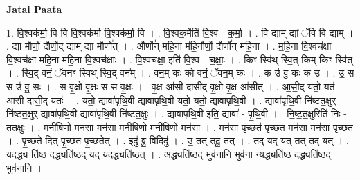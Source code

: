 \documentclass[17pt]{extarticle}
\begin{document}
\textbf{Jatai Paata} \newline

1. वि॒श्वक॑र्मा॒ वि वि वि॒श्वक॑र्मा वि॒श्वक॑र्मा॒ वि । . वि॒श्वक॒र्मेति॑ वि॒श्व - क॒र्मा॒ । . वि द्याम् द्यां ॅवि वि द्याम् । . द्या मौर्णो॒ दौर्णो॒द् द्याम् द्या मौर्णो᳚त् । . और्णो᳚न् महि॒ना म॑हि॒नौर्णो॒ दौर्णो᳚न् महि॒ना । . म॒हि॒ना वि॒श्वच॑क्षा वि॒श्वच॑क्षा महि॒ना म॑हि॒ना वि॒श्वच॑क्षाः । . वि॒श्वच॑क्षा॒ इति॑ वि॒श्व - च॒क्षाः॒ । . किꣳ स्वि॑थ् स्वि॒त् किम् किꣳ स्वि॑त् । . स्वि॒द् वनं॒ ॅवनꣳ॑ स्विथ् स्वि॒द् वन᳚म् । . वन॒म् कः को वनं॒ ॅवन॒म् कः । . क उ॑ वु॒ कः क उ॑ । . उ॒ स स उ॑ वु॒ सः । . स वृ॒क्षो वृ॒क्षः स स वृ॒क्षः । . वृ॒क्ष आ॑सी दासीद् वृ॒क्षो वृ॒क्ष आ॑सीत् । . आ॒सी॒द् यतो॒ यत॑ आसी दासी॒द् यतः॑ । . यतो॒ द्यावा॑पृथि॒वी द्यावा॑पृथि॒वी यतो॒ यतो॒ द्यावा॑पृथि॒वी । . द्यावा॑पृथि॒वी नि॑ष्टत॒क्षुर् नि॑ष्टत॒क्षुर् द्यावा॑पृथि॒वी द्यावा॑पृथि॒वी नि॑ष्टत॒क्षुः । . द्यावा॑पृथि॒वी इति॒ द्यावा᳚ - पृ॒थि॒वी । . नि॒ष्ट॒त॒क्षुरिति॑ निः - त॒त॒क्षुः । . मनी॑षिणो॒ मन॑सा॒ मन॑सा॒ मनी॑षिणो॒ मनी॑षिणो॒ मन॑सा । . मन॑सा पृ॒च्छत॑ पृ॒च्छत॒ मन॑सा॒ मन॑सा पृ॒च्छत॑ । . पृ॒च्छते दित् पृ॒च्छत॑ पृ॒च्छतेत् । . इदु॑ वु॒ विदिदु॑ । . उ॒ तत् तदू॒ तत् । . तद् यद् यत् तत् तद् यत् । . यद॒द्ध्य ति॑ष्ठ द॒द्ध्यति॑ष्ठ॒द् यद् यद॒द्ध्यति॑ष्ठत् । . अ॒द्ध्यति॑ष्ठ॒द् भुव॑नानि॒ भुव॑ना न्य॒द्ध्यति॑ष्ठ द॒द्ध्यति॑ष्ठ॒द् भुव॑नानि । \newline
\end{document}
